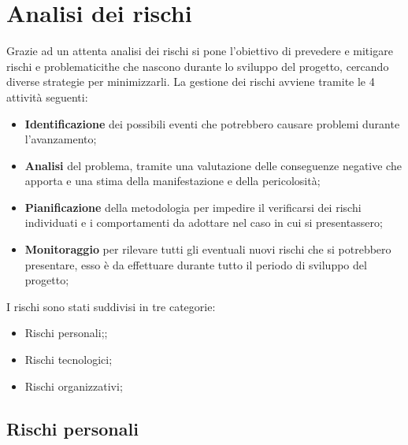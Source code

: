 \section{Analisi dei rischi}

Grazie ad un attenta analisi dei rischi si pone l'obiettivo di prevedere e mitigare rischi e problematicithe che nascono durante lo sviluppo del progetto, cercando diverse strategie per minimizzarli. 
La gestione dei rischi avviene tramite le 4 attività seguenti:
\begin{itemize}
	\item \textbf{Identificazione} dei possibili eventi che potrebbero causare problemi durante l'avanzamento;
	\item \textbf{Analisi} del problema, tramite una valutazione delle conseguenze negative  che apporta e una stima della manifestazione e della pericolosità;
	\item \textbf{Pianificazione} della metodologia per impedire il verificarsi dei rischi individuati e i comportamenti da adottare nel caso in cui si presentassero;
	\item \textbf{Monitoraggio} per rilevare tutti gli eventuali nuovi rischi che si potrebbero presentare, esso è da effettuare durante tutto il periodo di sviluppo del progetto;
\end{itemize}

I rischi sono stati suddivisi in tre categorie:
\begin{itemize}
	\item Rischi personali;;
	\item Rischi tecnologici;
	\item Rischi organizzativi;
\end{itemize}

\subsection{Rischi personali}

